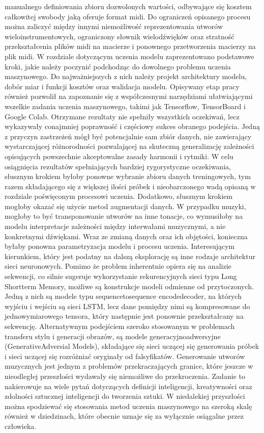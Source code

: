 manualnego definiowania zbioru dozwolonych wartości, odbywające się kosztem całkowitej swobody jaką oferuje format midi. Do ograniczeń opisanego procesu można zaliczyć między innymi niemożliwość reprezentowania utworów wieloinstrumentowych,  ograniczony słownik wielodźwięków oraz stratność przekształcenia plików midi na macierze i ponownego przetworzenia macierzy na plik midi. W rozdziale dotyczącym uczenia modelu zaprezentowano podstawowe kroki, jakie należy poczynić podchodząc do dowolnego problemu uczenia maszynowego. Do najważniejszych z nich należy projekt architektury modelu, dobór miar i funkcji kosztów oraz walidacja modelu. Opisywany etap pracy również pozwolił na zapoznanie  się z współczesnymi narzędziami ułatwiającymi wszelkie zadania uczenia maszynowego, takimi jak Tensorflow,  TensorBoard i Google Colab.  Otrzymane rezultaty nie spełniły wszystkich oczekiwań, lecz wykazywały conajmniej poprawność i częściowy sukces obranego podejścia. Jedną z przyczyn zastrzeżeń mógł być potencjalnie sam zbiór danych, nie  zawierający wystarczającej różnorodności pozwalającej na skuteczną generalizację zależności opisujących  powszechnie akceptowalne zasady harmonii i rytmiki. W celu osiągnięcia rezultatów spełniających bardziej rygorystyczne oczekiwania, słusznym krokiem byłoby ponowne wybranie zbioru danych treningowych, tym razem składającego się z większej ilości próbek i nieobarczonego wadą opisaną w rozdziale poświęconym procesowi uczenia.  Dodatkowo, słusznym krokiem mogłoby okazać się użycie metod augmentacji danych. W przypadku muzyki, mogłoby to być transponowanie utworów na inne tonacje, co wymusiłoby na modelu interpretacje zależności między interwałami muzycznymi, a nie konkretnymi dźwiękami. Wraz ze zmianą danych oraz ich objętości, konieczna byłaby ponowna parametryzacja modelu i procesu uczenia. Interesującym kierunkiem, który jest podatny na dalszą eksplorację są inne rodzaje architektur sieci neuronowych. Pomimo że problem inherentnie opiera się na analizie sekwencji, co silnie sugeruje wykorzystanie rekurencyjnych  sieci typu Long Shortterm Memory, możliwe są konstrukcje modeli odmienne od przytoczonych. Jedną z nich są modele typu  sequencetosequence encodedecoder, na których wyjściu i wejściu są sieci LSTM, lecz dane pomiędzy nimi są kompresowane do jednowymiarowego tensora, który następnie jest ponownie przekształcany na sekwencję.  Alternatywnym podejściem szeroko stosowanym w problemach transferu stylu i generacji obrazów,  są modele generacyjnoadwersyjne (GenerativeAdversial Models), składające się sieci uczącej się generowania  próbek i sieci uczącej się rozróżniać oryginały od falsyfikatów. Generowanie utworów muzycznych jest jednym z problemów przekraczających granice, które jeszcze w nieodległej przeszłości wydawały się niemożliwe do przekroczenia. Zadanie to nakierowuje na wiele pytań  dotyczących definicji inteligencji, kreatywności oraz zdolności sztucznej inteligencji do tworzenia sztuki.  W niedalekiej przyszłości można spodziewać się stosowania metod uczenia maszynowego na szeroką skalę również w dziedzinach, które obecnie uznaje się za wyłącznie osiągalne przez człowieka.  